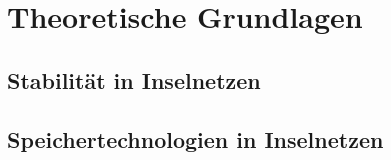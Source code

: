 \chapter{Theoretische Grundlagen}

\section{Stabilität in Inselnetzen}

\section{Speichertechnologien in Inselnetzen}